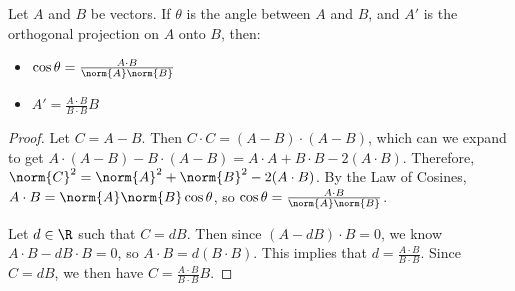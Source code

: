 \documentclass[12pt]{article}
\begin{document}
\begin{thm} Let $A$ and $B$ be vectors. If $\theta$ is the angle between $A$ and $B$, and $A'$ is the orthogonal projection on $A$ onto $B$, then:
    \begin{itemize}
        \item $\cos\theta = \frac{A \cdot B}{\norm{A}\norm{B}}$
        \item $A' = \frac{A \cdot B}{B \cdot B}B$
    \end{itemize}
\end{thm}

\begin{proof}\proofbreak
    Let $C = A - B$. Then $C \cdot C = (A - B) \cdot (A - B)$, which can we expand to get $A \cdot (A - B) - B \cdot (A - B) = A \cdot A + B \cdot B - 2(A \cdot B)$. Therefore, $\norm{C}^2 = \norm{A}^2 + \norm{B}^2 - 2(A \cdot B)$. By the Law of Cosines, $A \cdot B = \norm{A}\norm{B}\cos\theta$, so $\cos\theta = \frac{A \cdot B}{\norm{A}\norm{B}}$.

    Let $d \in \R$ such that $C = dB$. Then since $(A - dB) \cdot B = 0$, we know $A \cdot B - dB \cdot B = 0$, so $A \cdot B = d(B \cdot B)$. This implies that $d = \frac{A \cdot B}{B \cdot B}$. Since $C = dB$, we then have $C = \frac{A \cdot B}{B \cdot B}B$.
\end{proof}
\end{document}
